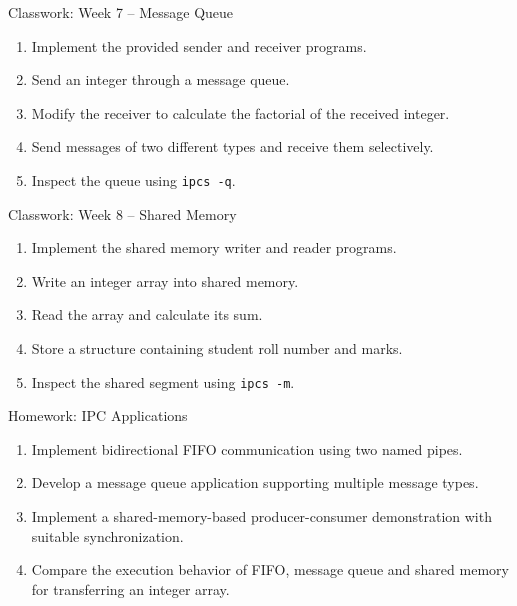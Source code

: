 \documentclass[aspectratio=169,10pt]{beamer}
\begin{document}
\begin{frame}{Classwork: Week 7 -- Message Queue}

\begin{enumerate}
    \item Implement the provided sender
    and receiver programs.

    \item Send an integer through a message queue.

    \item Modify the receiver to calculate
    the factorial of the received integer.

    \item Send messages of two different types
    and receive them selectively.

    \item Inspect the queue using
    \texttt{ipcs -q}.
\end{enumerate}

\end{frame}

\begin{frame}{Classwork: Week 8 -- Shared Memory}

\begin{enumerate}
    \item Implement the shared memory writer
    and reader programs.

    \item Write an integer array into shared memory.

    \item Read the array and calculate its sum.

    \item Store a structure containing
    student roll number and marks.

    \item Inspect the shared segment using
    \texttt{ipcs -m}.
\end{enumerate}

\end{frame}

\begin{frame}{Homework: IPC Applications}

\begin{enumerate}
    \item Implement bidirectional FIFO communication
    using two named pipes.

    \item Develop a message queue application
    supporting multiple message types.

    \item Implement a shared-memory-based
    producer-consumer demonstration with
    suitable synchronization.

    \item Compare the execution behavior
    of FIFO, message queue and shared memory
    for transferring an integer array.
\end{enumerate}

\end{frame}
\end{document}
